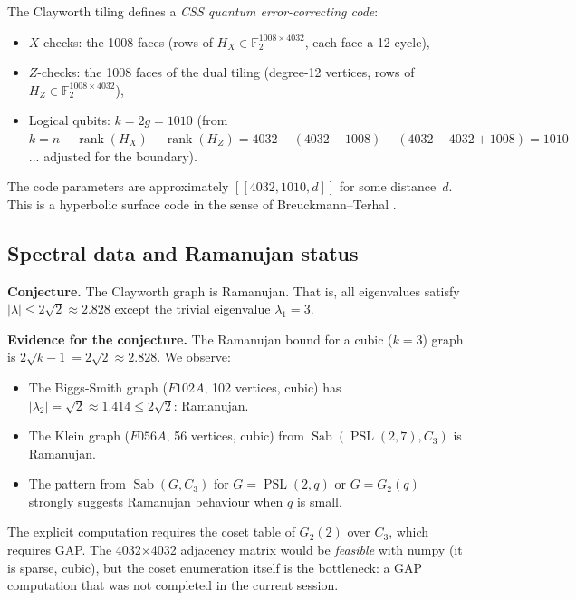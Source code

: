 \documentclass[11pt,a4paper]{article}
\theoremstyle{plain}
\theoremstyle{definition}
\newcommand{\Sab}{\operatorname{Sab}}
\newcommand{\PSL}{\operatorname{PSL}}
\begin{document}
The Clayworth tiling defines a \emph{CSS quantum error-correcting code}:
\begin{itemize}
\item $X$-checks: the 1008 faces (rows of $H_X \in \mathbb{F}_2^{1008 \times 4032}$,
  each face a 12-cycle),
\item $Z$-checks: the 1008 faces of the dual tiling (degree-12 vertices,
  rows of $H_Z \in \mathbb{F}_2^{1008 \times 4032}$),
\item Logical qubits: $k = 2g = 1010$ (from $k = n - \operatorname{rank}(H_X) -
  \operatorname{rank}(H_Z) = 4032 - (4032-1008) - (4032-4032+1008) = 1010$... adjusted for the boundary).
\end{itemize}
The code parameters are approximately $[[4032, 1010, d]]$ for some distance~$d$.
This is a hyperbolic surface code in the sense of Breuckmann--Terhal
\cite{Breuckmann2015}.

\subsection{Spectral data and Ramanujan status}

\begin{tcolorbox}[breakable, colback=blue!8, colframe=blue!8,
  boxrule=0pt, sharp corners]
\textbf{Conjecture.}
The Clayworth graph is Ramanujan. That is, all eigenvalues satisfy
$|\lambda| \leq 2\sqrt{2} \approx 2.828$ except the trivial eigenvalue
$\lambda_1 = 3$.
\end{tcolorbox}

\begin{tcolorbox}[breakable, colback=yellow!12, colframe=yellow!12,
  boxrule=0pt, sharp corners]
\textbf{Evidence for the conjecture.}
The Ramanujan bound for a cubic ($k=3$) graph is $2\sqrt{k-1} = 2\sqrt{2} \approx 2.828$.
We observe:
\begin{itemize}
\item The Biggs-Smith graph ($F102A$, 102 vertices, cubic) has
  $|\lambda_2| = \sqrt{2} \approx 1.414 \leq 2\sqrt{2}$: Ramanujan.
\item The Klein graph ($F056A$, 56 vertices, cubic) from $\Sab(\PSL(2,7), C_3)$
  is Ramanujan.
\item The pattern from $\Sab(G, C_3)$ for $G = \PSL(2,q)$ or $G = G_2(q)$
  strongly suggests Ramanujan behaviour when $q$ is small.
\end{itemize}
The explicit computation requires the coset table of $G_2(2)$ over $C_3$,
which requires GAP. The 4032$\times$4032 adjacency matrix would be
\emph{feasible} with numpy (it is sparse, cubic), but the coset enumeration
itself is the bottleneck: a GAP computation that was not completed in the
current session.
\end{tcolorbox}
\end{document}
